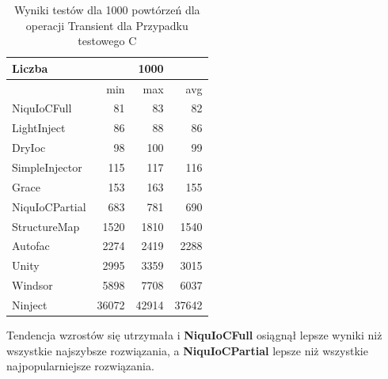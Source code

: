 \documentclass[12pt]{article}
\begin{document}
\begin{table}[H]
\captionsetup{belowskip=0pt,aboveskip=0pt}
\begin{center}
\begin{small}
	\begin{tabular}{ | l | r r r | }
    		\hline
Liczba & & 1000 & \\ \hline
 & min & max & avg \\ \hline
NiquIoCFull & 81 & 83 & 82 \\ \hline
LightInject & 86 & 88 & 86 \\ \hline
DryIoc & 98 & 100 & 99 \\ \hline
SimpleInjector & 115 & 117 & 116 \\ \hline
Grace & 153 & 163 & 155 \\ \hline
NiquIoCPartial & 683 & 781 & 690 \\ \hline
StructureMap & 1520 & 1810 & 1540 \\ \hline
Autofac & 2274 & 2419 & 2288 \\ \hline
Unity & 2995 & 3359 & 3015 \\ \hline
Windsor & 5898 & 7708 & 6037 \\ \hline
Ninject & 36072 & 42914 & 37642 \\ \hline
  	\end{tabular}
\end{small}
\end{center}
\caption{Wyniki testów dla 1000 powtórzeń dla operacji Transient dla Przypadku testowego C}
\label{TestCaseC_Transient1000}
\end{table}
Tendencja wzrostów się utrzymała i \textbf{NiquIoCFull} osiągnął lepsze wyniki niż wszystkie najszybsze rozwiązania, a \textbf{NiquIoCPartial} lepsze niż wszystkie najpopularniejsze rozwiązania.
\end{document}
